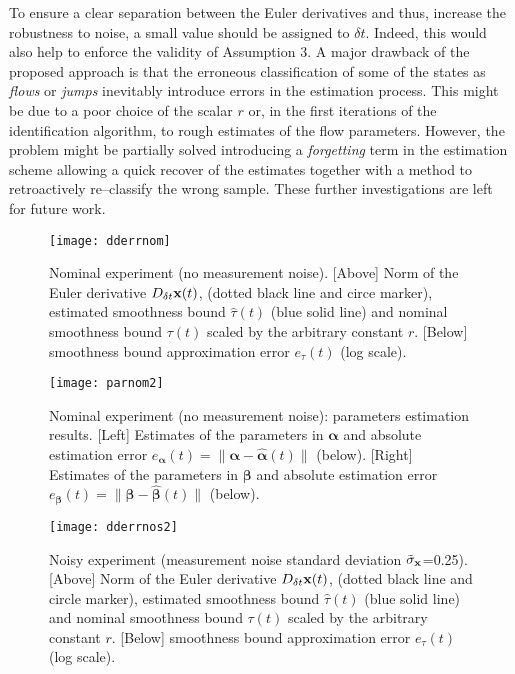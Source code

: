  To ensure a clear separation between the Euler derivatives and thus, increase the robustness to noise, a small value should be assigned to $\delta t$. {%
 Indeed, this would also help to enforce the validity of Assumption 3.
 }
 {%
 A major drawback of the proposed approach is that the erroneous classification of some of the states as \textit{flows} or \textit{jumps} inevitably introduce errors in the estimation process. This might be due to a poor choice of the scalar $r$ or, in the first iterations of the identification algorithm, to rough estimates of the flow parameters. 
However, the problem might be partially solved introducing a \textit{forgetting} term in the estimation scheme \cite{soderstrom2018errors} allowing a quick recover of the estimates together with a method to retroactively re--classify the wrong sample. These further investigations are left for future work.
 }
\begin{figure}[!ht]
	\centering
	\texttt{[image: dderrnom]}
	\caption[Nominal experiment: norm of the Euler derivative and estimated smoothness bound.]{Nominal experiment (no measurement noise). [Above] Norm of the Euler derivative $D_{\delta t}\mathbf{x}(t)$, (dotted black line and circe marker), estimated smoothness bound $\hat{\tau}(t)$ (blue solid line) and nominal smoothness bound $\tau(t)$ scaled by the arbitrary constant $r$. [Below] smoothness bound approximation error $e_{\tau}(t)$ (log scale).}
	\label{fig:dderrnom}
\end{figure}
%
%
\begin{figure}[!ht]
	\centering
	\texttt{[image: parnom2]}
	\caption[Nominal experiment: parameters estimation results.]{Nominal experiment (no measurement noise): parameters estimation results. [Left] Estimates of the parameters in $\bm{\alpha}$ and absolute estimation error $e_{\bm{\alpha}}(t)=\|\bm{\alpha}-\hat{\bm{\alpha}}(t)\|$ (below). [Right] Estimates of the parameters in $\bm{\beta}$ and absolute estimation error $e_{\bm{\beta}}(t)=\|\bm{\beta}-\hat{\bm{\beta}}(t)\|$ (below).}
	\label{fig:parnom}
\end{figure}
%
\begin{figure}[!ht]
	\centering
	\texttt{[image: dderrnos2]}
	\caption[Noisy experiment: norm of the Euler derivative and estimated smoothness bound.]{Noisy experiment (measurement noise standard deviation $\tilde{\sigma}_{\mathbf{x}}$=0.25). [Above] Norm of the Euler derivative $D_{\delta t}\mathbf{x}(t)$, (dotted black line and circle marker), estimated smoothness bound $\hat{\tau}(t)$ (blue solid line) and nominal smoothness bound $\tau(t)$ scaled by the arbitrary constant $r$. [Below] smoothness bound approximation error $e_{\tau}(t)$ (log scale).}
	\label{fig:dderrnos}
\end{figure}
